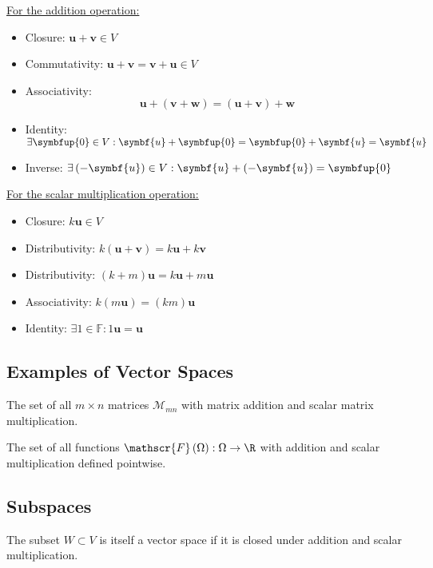 \documentclass{article}
\begin{document}
\begin{multicols*}{3}
    \underline{For the addition operation:}
    \begin{itemize}
        \item Closure: \(\symbf{u} + \symbf{v} \in V\)
        \item Commutativity: \(\symbf{u} + \symbf{v} = \symbf{v} +
              \symbf{u} \in V\)
        \item Associativity:
              \begin{equation*}
                  \symbf{u} + \left( \symbf{v} + \symbf{w} \right) = \left( \symbf{u} + \symbf{v} \right) + \symbf{w}
              \end{equation*}
        \item Identity: \(\exists \symbfup{0} \in V : \symbf{u} +
              \symbfup{0} = \symbfup{0} + \symbf{u} = \symbf{u}\)
        \item Inverse: \(\exists \left( -\symbf{u} \right) \in V :
              \symbf{u} + \left( -\symbf{u} \right) = \symbfup{0}\)
    \end{itemize}
    \underline{For the scalar multiplication operation:}
    \begin{itemize}
        \item Closure: \(k \symbf{u} \in V\)
        \item Distributivity: \(k \left( \symbf{u} + \symbf{v} \right)
              = k\symbf{u} + k\symbf{v}\)
        \item Distributivity: \(\left( k + m \right) \symbf{u} =
              k\symbf{u} + m\symbf{u}\)
        \item Associativity: \(k \left( m\symbf{u} \right) = \left( k m
              \right) \symbf{u}\)
        \item Identity: \(\exists 1 \in \mathbb{F} : 1 \symbf{u} =
              \symbf{u}\)
    \end{itemize}
    \subsection{Examples of Vector Spaces}
    The set of all \(m \times n\) matrices \(\mathscr{M}_{mn}\) with
    matrix addition and scalar matrix multiplication.

    The set of all functions \(\mathscr{F}\left( \Omega \right) :
    \Omega \to \R\) with addition and scalar multiplication defined
    pointwise.
    \subsection{Subspaces}
    The subset \(W \subset V\) is itself a vector space if it is closed
    under addition and scalar multiplication.

\end{multicols*}
\end{document}

